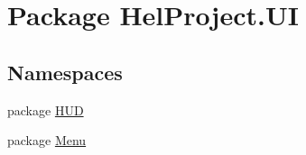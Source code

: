 \hypertarget{namespace_hel_project_1_1_u_i}{}\section{Package Hel\+Project.\+U\+I}
\label{namespace_hel_project_1_1_u_i}
\subsection*{Namespaces}
\begin{DoxyCompactItemize}
\item 
package \hyperlink{namespace_hel_project_1_1_u_i_1_1_h_u_d}{H\+U\+D}
\item 
package \hyperlink{namespace_hel_project_1_1_u_i_1_1_menu}{Menu}
\end{DoxyCompactItemize}
